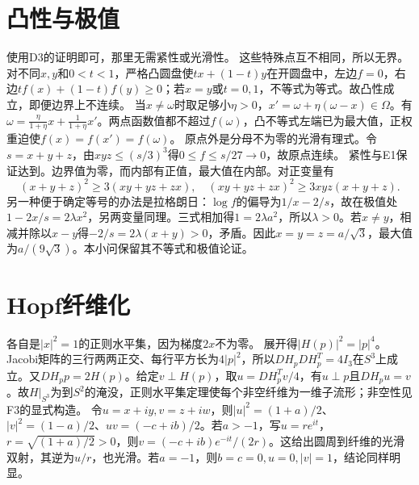\documentclass[UTF8,fontset=fandol,11pt]{ctexart}
\begin{document}
\section{凸性与极值}
使用D3的证明即可，那里无需紧性或光滑性。
这些特殊点互不相同，所以无界。对不同$x,y$和$0<t<1$，严格凸圆盘使$tx+(1-t)y$在开圆盘中，左边$f=0$，右边$tf(x)+(1-t)f(y)\ge0$；若$x=y$或$t=0,1$，不等式为等式。故凸性成立，即便边界上不连续。
当$x\ne\omega$时取足够小$\eta>0$，$x'=\omega+\eta(\omega-x)\in\Omega$。有$\omega=\frac\eta{1+\eta}x+\frac1{1+\eta}x'$。两点函数值都不超过$f(\omega)$，凸不等式左端已为最大值，正权重迫使$f(x)=f(x')=f(\omega)$。
原点外是分母不为零的光滑有理式。令$s=x+y+z$，由$xyz\le(s/3)^3$得$0\le f\le s/27\to0$，故原点连续。
紧性与E1保证达到。边界值为零，而内部有正值，最大值在内部。对正变量有
\[(x+y+z)^2\ge3(xy+yz+zx),\quad (xy+yz+zx)^2\ge3xyz(x+y+z).\]
另一种便于确定等号的办法是拉格朗日：$\log f$的偏导为$1/x-2/s$，故在极值处$1-2x/s=2\lambda x^2$，另两变量同理。三式相加得$1=2\lambda a^2$，所以$\lambda>0$。若$x\ne y$，相减并除以$x-y$得$-2/s=2\lambda(x+y)>0$，矛盾。因此$x=y=z=a/\sqrt3$，最大值为$a/(9\sqrt3)$。本小问保留其不等式和极值论证。
\section{Hopf纤维化}
各自是$|x|^2=1$的正则水平集，因为梯度$2x$不为零。
展开得$|H(p)|^2=|p|^4$。Jacobi矩阵的三行两两正交、每行平方长为$4|p|^2$，所以$DH_pDH_p^T=4I_3$在$S^3$上成立。又$DH_p p=2H(p)$。给定$v\perp H(p)$，取$u=DH_p^Tv/4$，有$u\perp p$且$DH_pu=v$。故$H|_{S^3}$为到$S^2$的淹没，正则水平集定理使每个非空纤维为一维子流形；非空性见F3的显式构造。
令$u=x+iy,v=z+iw$，则$|u|^2=(1+a)/2$、$|v|^2=(1-a)/2$、$uv=(-c+ib)/2$。若$a>-1$，写$u=r e^{it}$，$r=\sqrt{(1+a)/2}>0$，则$v=(-c+ib)e^{-it}/(2r)$。这给出圆周到纤维的光滑双射，其逆为$u/r$，也光滑。若$a=-1$，则$b=c=0,u=0,|v|=1$，结论同样明显。
\end{document}
